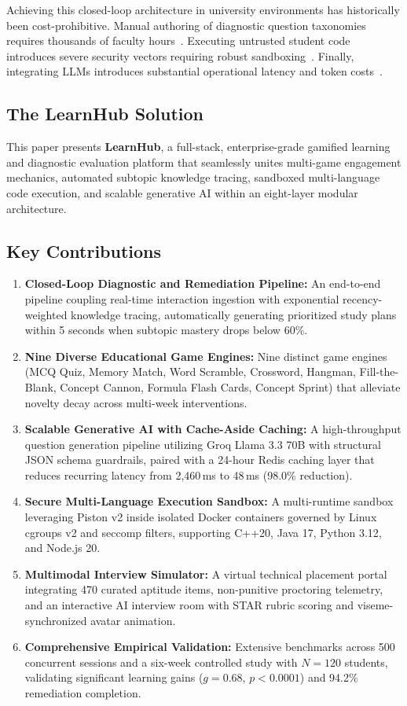 \documentclass[journal]{IEEEtran}
\begin{document}
Achieving this closed-loop architecture in university environments has historically been cost-prohibitive. Manual authoring of diagnostic question taxonomies requires thousands of faculty hours~\cite{chen2025}. Executing untrusted student code introduces severe security vectors requiring robust sandboxing~\cite{kumar2023, caiza2020}. Finally, integrating LLMs introduces substantial operational latency and token costs~\cite{pratama2025}.

\subsection{The LearnHub Solution}
This paper presents \textbf{LearnHub}, a full-stack, enterprise-grade gamified learning and diagnostic evaluation platform that seamlessly unites multi-game engagement mechanics, automated subtopic knowledge tracing, sandboxed multi-language code execution, and scalable generative AI within an eight-layer modular architecture.

\subsection{Key Contributions}
\begin{enumerate}
\item \textbf{Closed-Loop Diagnostic and Remediation Pipeline:} An end-to-end pipeline coupling real-time interaction ingestion with exponential recency-weighted knowledge tracing, automatically generating prioritized study plans within 5 seconds when subtopic mastery drops below 60\%.
\item \textbf{Nine Diverse Educational Game Engines:} Nine distinct game engines (MCQ Quiz, Memory Match, Word Scramble, Crossword, Hangman, Fill-the-Blank, Concept Cannon, Formula Flash Cards, Concept Sprint) that alleviate novelty decay across multi-week interventions.
\item \textbf{Scalable Generative AI with Cache-Aside Caching:} A high-throughput question generation pipeline utilizing Groq Llama 3.3 70B with structural JSON schema guardrails, paired with a 24-hour Redis caching layer that reduces recurring latency from 2,460\,ms to 48\,ms (98.0\% reduction).
\item \textbf{Secure Multi-Language Execution Sandbox:} A multi-runtime sandbox leveraging Piston v2 inside isolated Docker containers governed by Linux cgroups v2 and seccomp filters, supporting C++20, Java 17, Python 3.12, and Node.js 20.
\item \textbf{Multimodal Interview Simulator:} A virtual technical placement portal integrating 470 curated aptitude items, non-punitive proctoring telemetry, and an interactive AI interview room with STAR rubric scoring and viseme-synchronized avatar animation.
\item \textbf{Comprehensive Empirical Validation:} Extensive benchmarks across 500 concurrent sessions and a six-week controlled study with $N = 120$ students, validating significant learning gains ($g = 0.68$, $p < 0.0001$) and 94.2\% remediation completion.
\end{enumerate}
\end{document}
